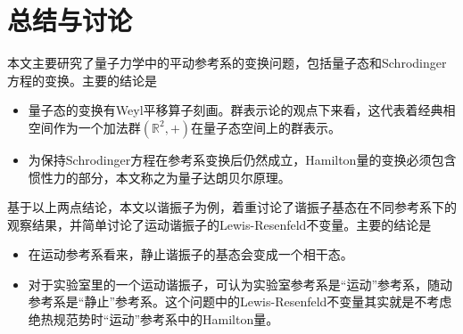 \documentclass[a4paper]{article}
\begin{document}
    \section{总结与讨论}

        本文主要研究了量子力学中的平动参考系的变换问题，包括量子态和Schrodinger方程的变换。主要的结论是

        \begin{itemize}
            \item 量子态的变换有Weyl平移算子刻画。群表示论的观点下来看，这代表着经典相空间作为一个加法群$(\mathbb{R}^2,+)$在量子态空间上的群表示。
            \item 为保持Schrodinger方程在参考系变换后仍然成立，Hamilton量的变换必须包含惯性力的部分，本文称之为量子达朗贝尔原理。
        \end{itemize}

        基于以上两点结论，本文以谐振子为例，着重讨论了谐振子基态在不同参考系下的观察结果，并简单讨论了运动谐振子的Lewis-Resenfeld不变量。主要的结论是

        \begin{itemize}
            \item 在运动参考系看来，静止谐振子的基态会变成一个相干态。
            \item 对于实验室里的一个运动谐振子，可认为实验室参考系是“运动”参考系，随动参考系是“静止”参考系。这个问题中的Lewis-Resenfeld不变量其实就是不考虑绝热规范势时“运动”参考系中的Hamilton量。
        \end{itemize}


\begin{thebibliography}{9}
\end{thebibliography}
\end{document}
